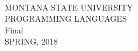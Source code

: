 \documentclass[addpoints]{exam}
\begin{document}
\begin{coverpages}
\begin{center}
  {\makebox[3.5in]{\hrulefill}\\
  \vspace{1.5em}
  {\Large MONTANA STATE UNIVERSITY}\\
  \vspace{.5em}
  PROGRAMMING LANGUAGES\\
  \vspace{.5em}
  Final\\
  \vspace{.5em}
  SPRING, 2018
  \\
  \vspace{1em}
  \makebox[3.5in]{\hrulefill}\\
  \par}
  \vspace{0.5in}

  \vspace{0.2in}

  \vspace{0.2in}  

  \setlength{\doublerulesep}{0.1in}
  \gradetable[v][questions]
\end{center}

\end{coverpages}
\end{document}

